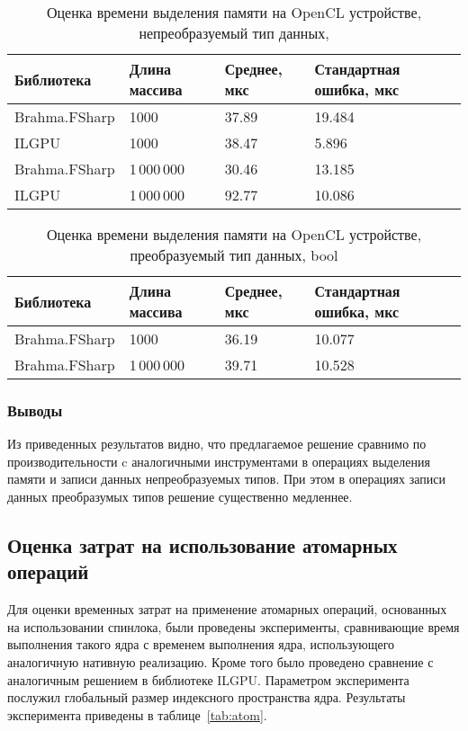 \begin{table}
    \begin{tabularx}{\textwidth}{|X|X|X|X|}
      \hline
      \textbf{Библиотека} & \textbf{Длина массива} & \textbf{Среднее, мкс} & \textbf{Стандартная ошибка, мкс} \\
      \hline
      Brahma.FSharp & 1000 & 37.89  & 19.484   \\
      ILGPU & 1000 & 38.47  & 5.896 \\
      \hline
      Brahma.FSharp & 1\,000\,000 & 30.46  & 13.185   \\
      ILGPU & 1\,000\,000 & 92.77  & 10.086   \\
      \hline
    \end{tabularx}
  \caption{Оценка времени выделения памяти на OpenCL устройстве, непреобразуемый тип данных, }
  \label{tab:blit-a}
\end{table}

\begin{table}
    \begin{tabularx}{\textwidth}{|X|X|X|X|}
      \hline
      \textbf{Библиотека} & \textbf{Длина массива} & \textbf{Среднее, мкс} & \textbf{Стандартная ошибка, мкс} \\
      \hline
      Brahma.FSharp & 1000 & 36.19 & 10.077   \\
      \hline
      Brahma.FSharp & 1\,000\,000 &  39.71 & 10.528  \\
      \hline
    \end{tabularx}
  \caption{Оценка времени выделения памяти на OpenCL устройстве, преобразуемый тип данных, bool}
  \label{tab:nonblit-a}
\end{table}

\subsubsection{Выводы}
Из приведенных результатов видно, что предлагаемое решение сравнимо по производительности c аналогичными инструментами в операциях выделения памяти и записи данных непреобразуемых типов. При этом в операциях записи данных преобразумых типов решение существенно медленнее.

\subsection{Оценка затрат на использование атомарных операций}
Для оценки временных затрат на применение атомарных операций, основанных на использовании спинлока, были проведены эксперименты, сравнивающие время выполнения такого ядра с временем выполнения ядра, использующего аналогичную нативную реализацию. Кроме того было проведено сравнение с аналогичным решением в библиотеке ILGPU. Параметром эксперимента послужил глобальный размер индексного пространства ядра. Результаты эксперимента приведены в таблице~\ref{tab:atom}.

